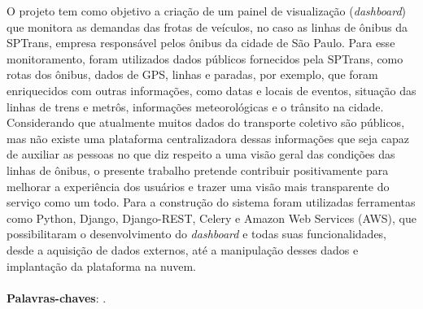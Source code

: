 \begin{resumo}
\indent
\par O projeto tem como objetivo a criação de um painel de visualização (\textit{dashboard}) que monitora as demandas das   frotas   de veículos, no caso as linhas de ônibus da SPTrans, empresa responsável pelos ônibus da cidade de São Paulo. Para esse monitoramento, foram utilizados dados públicos fornecidos pela SPTrans, como rotas dos ônibus, dados de GPS, linhas e paradas, por exemplo, que foram enriquecidos com outras informações, como datas e locais de eventos, situação das linhas de trens e metrôs, informações meteorológicas e o trânsito na cidade. Considerando que atualmente muitos dados do transporte coletivo são públicos, mas não existe uma plataforma centralizadora dessas informações que seja capaz de auxiliar as pessoas no que diz respeito a uma visão geral das condições das linhas de ônibus, o presente trabalho pretende contribuir positivamente para melhorar a experiência dos usuários e trazer uma visão mais transparente do serviço como um todo. Para a construção do sistema foram utilizadas ferramentas como Python, Django, Django-REST, Celery e Amazon Web Services (AWS), que possibilitaram o desenvolvimento do \textit{dashboard} e todas suas funcionalidades, desde a aquisição de dados externos, até a manipulação desses dados e implantação da plataforma na nuvem.
\\
\\
\textbf{Palavras-chaves}: \PalavraChaveA.~

\end{resumo}
